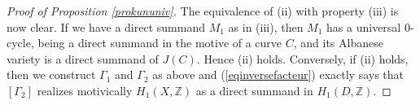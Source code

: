 \documentclass[10pt,a4paper]{amsart}
\begin{document}
\begin{proof}[Proof of Proposition \ref{prokununiv}]
The equivalence of  (ii) with property (iii) is  now clear. If we have a direct summand $M_1$ as in (iii), then $M_1$ has a universal $0$-cycle, being a direct summand in the motive of a curve $C$, and its Albanese variety is a direct summand of $J(C)$. Hence (ii) holds. Conversely, if (ii) holds, then we construct $\Gamma_1$ and $\Gamma_2$ as above and (\ref{eqinversefacteur}) exactly says that $[\Gamma_2]$ realizes motivically  $H_1(X,\mathbb{Z})$ as a direct summand in $H_1(D,\mathbb{Z})$.
\end{proof}
\end{document}

